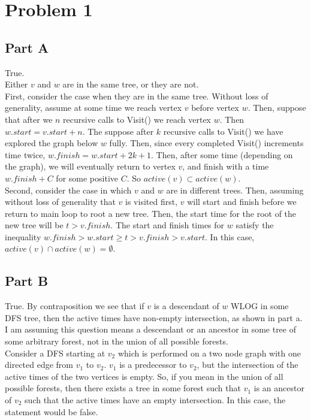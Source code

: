 \documentclass[10pt]{article}
\begin{document}
\section*{Problem 1}
\subsection*{Part A}
True. \\

Either $v$ and $w$ are in the same tree, or they are not.\\

First, consider the case when they are in the same tree. Without loss of generality, assume at some time we reach vertex $v$ before vertex $w$. Then, suppose that after we $n$ recursive calls to Visit() we reach vertex $w$. Then $w.start = v.start + n$. The suppose after $k$ recursive calls to Visit() we have explored the graph below $w$ fully. Then, since every completed Visit() increments time twice,  $w.finish = w.start + 2k + 1$. Then, after some time (depending on the graph), we will eventually return to vertex $v$, and finish with a time $w.finish + C$ for some positive $C$. So $active(v)\subset active(w)$.\\

Second, consider the case in which  $v$ and $w$ are in different trees. Then, assuming without loss of generality that $v$ is visited first, $v$ will start and finish before we return to main loop to root a new tree. Then, the start time for the root of the new tree will be $t > v.finish$. The start and finish times for $w$ satisfy the inequality $w.finish > w.start \ge t > v.finish > v.start$. In this case, $active(v)\cap active(w) = \emptyset$.
\subsection*{Part B}
True. By contraposition we see that if $v$ is a descendant of $w$ WLOG in some DFS tree, then the active times have non-empty intersection, as shown in part a.\\

I am assuming this question means a descendant or an ancestor in some tree of some arbitrary forest, not in the union of all possible forests.\\

Consider a DFS starting at $v_2$ which is performed on a two node graph with one directed edge from $v_1$ to $v_2$. $v_1$ is a predecessor to $v_2$, but the intersection of the active times of the two vertices is empty. So, if you mean in the union of all possible forests, then there exists a tree in some forest such that $v_1$ is an ancestor of $v_2$ such that the active times have an empty intersection. In this case, the statement would be false. 
\end{document}
